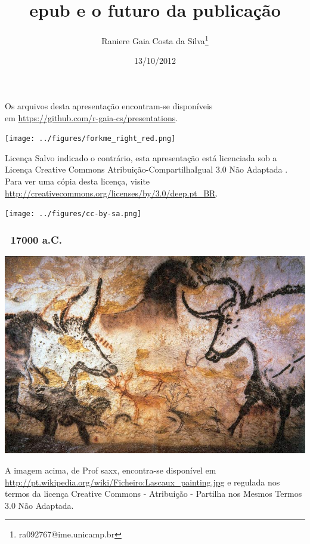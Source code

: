 \documentclass[]{beamer}
\begin{document}
\title[epub]{epub e o futuro da publica\c{c}\~{a}o}
\author[Raniere Silva]{Raniere Gaia Costa da
Silva\footnote{ra092767@ime.unicamp.br}}
\date{13/10/2012}

\begin{frame}
    \titlepage
\end{frame}

\begin{frame}
  \begin{block}{}
    Os arquivos desta apresentação encontram-se disponíveis \\
    em \url{https://github.com/r-gaia-cs/presentations}. \\
    \vspace{-33pt}
    \begin{flushright}
      \texttt{[image: ../figures/forkme\_right\_red.png]}
    \end{flushright}
  \end{block}

  \begin{block}{Licença}
    Salvo indicado o contrário, esta apresentação está licenciada sob a
    Licença Creative Commons Atribuição-CompartilhaIgual 3.0 Não Adaptada .
    Para ver uma cópia desta licença, visite
    \url{http://creativecommons.org/licenses/by/3.0/deep.pt_BR}.
    \begin{center}
      \texttt{[image: ../figures/cc-by-sa.png]}
    \end{center}
  \end{block}
\end{frame}

\begin{frame}
    \frametitle{~17000 a.C.}
    \begin{center}
        \includegraphics[height=0.6\textheight]{pictures/lascaux_painting.jpg}
    \end{center}

    \begin{tiny}
        A imagem acima, de Prof saxx, encontra-se dispon\'{i}vel em \url{http://pt.wikipedia.org/wiki/Ficheiro:Lascaux_painting.jpg} e regulada nos termos da licen\c{c}a Creative Commons - Atribui\c{c}\~{a}o - Partilha nos Mesmos Termos 3.0 N\~{a}o Adaptada.
    \end{tiny}
\end{frame}
\end{document}
